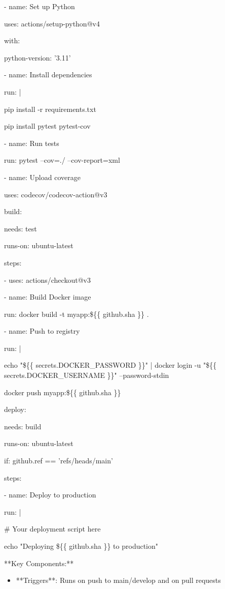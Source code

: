 \documentclass[11pt,a4paper]{article}
\begin{document}
      - name: Set up Python

        uses: actions/setup-python@v4

        with:

          python-version: '3.11'

      - name: Install dependencies

        run: |

          pip install -r requirements.txt

          pip install pytest pytest-cov

      - name: Run tests

        run: pytest --cov=./ --cov-report=xml

      - name: Upload coverage

        uses: codecov/codecov-action@v3

  build:

    needs: test

    runs-on: ubuntu-latest

    steps:

      - uses: actions/checkout@v3

      - name: Build Docker image

        run: docker build -t myapp:\$\{\{ github.sha \}\} .

      - name: Push to registry

        run: |

          echo "\$\{\{ secrets.DOCKER\_PASSWORD \}\}" | docker login -u "\$\{\{ secrets.DOCKER\_USERNAME \}\}" --password-stdin

          docker push myapp:\$\{\{ github.sha \}\}

  deploy:

    needs: build

    runs-on: ubuntu-latest

    if: github.ref == 'refs/heads/main'

    steps:

      - name: Deploy to production

        run: |

          \# Your deployment script here

          echo "Deploying \$\{\{ github.sha \}\} to production"

**Key Components:**

\begin{itemize}
\item **Triggers**: Runs on push to main/develop and on pull requests
\end{itemize}
\end{document}
